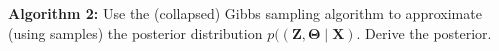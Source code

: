 \textbf{Algorithm 2:} Use the (collapsed) Gibbs sampling algorithm to approximate (using samples) the posterior distribution $p((\boldsymbol{Z}, \boldsymbol{\Theta} \mid \boldsymbol{X})$. Derive the posterior. \\\\